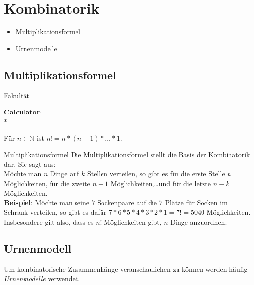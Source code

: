 \chapter{Kombinatorik}
\begin{inhalt}
  \begin{itemize}
    \item Multiplikationsformel
    \item Urnenmodelle
  \end{itemize}
\end{inhalt}
\section{Multiplikationsformel}

\begin{bla}{Fakultät}
  \begin{marginfigure}
    \begin{tcolorbox}[colback=white!95!black,colframe=white!75!black,title=CAS:,arc=0mm]
      \begin{scriptsize}
        \textbf{Calculator}: \\*
      \end{scriptsize}
    \end{tcolorbox}
  \end{marginfigure}
  Für $n\in\mathbb{N}$ ist $n!=n*(n-1)*\dots *1$.
\end{bla}

\begin{bla}{Multiplikationsformel}
  Die Multiplikationsformel stellt die Basis der Kombinatorik dar. Sie sagt aus:
  \\
  Möchte man $n$ Dinge auf $k$ Stellen verteilen, so gibt es für die erste Stelle
  $n$ Möglichkeiten, für die zweite $n-1$ Möglichkeiten,\dots und für die letzte $n-k$
  Möglichkeiten.
  \\
  \textbf{Beispiel}: Möchte man seine $7$ Sockenpaare auf die $7$ Plätze für Socken
  im Schrank verteilen, so gibt es dafür $7*6*5*4*3*2*1=7!=5040$ Möglichkeiten.
  Insbesondere gilt also, dass es $n! $ Möglichkeiten gibt, $n$ Dinge anzuordnen.
\end{bla}

\clearpage

\section{Urnenmodell}

Um kombinatorische Zusammenhänge veranschaulichen zu können werden häufig
\emph{Urnenmodelle} verwendet.

